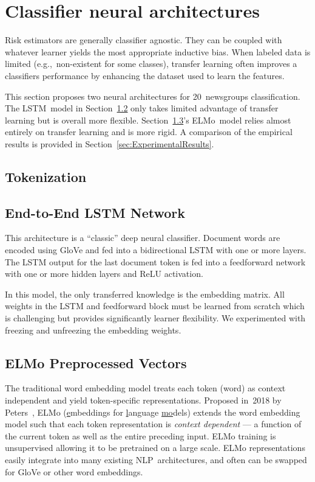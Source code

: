 \section{Classifier neural architectures}\label{sec:Architectures}

Risk estimators are generally classifier agnostic.  They can be coupled with whatever learner yields the most appropriate inductive bias. When labeled data is limited (e.g.,~non-existent for some classes), transfer learning often improves a classifiers performance by enhancing the dataset used to learn the features.

This section proposes two neural architectures for 20~newsgroups classification.  The LSTM~model in Section~\ref{sec:Architectures:LSTM} only takes limited advantage of transfer learning but is overall more flexible.  Section~\ref{sec:Architectures:ELMo}'s ELMo~model relies almost entirely on transfer learning and is more rigid. A comparison of the empirical results is provided in Section~\ref{sec:ExperimentalResults}.

\subsection{Tokenization}



\subsection{End-to-End LSTM Network}\label{sec:Architectures:LSTM}

This architecture is a ``classic'' deep neural classifier.  Document words are encoded using GloVe and fed into a bidirectional LSTM with one or more layers.  The LSTM output for the last document token is fed into a feedforward network with one or more hidden layers and ReLU activation.

In this model, the only transferred knowledge is the embedding matrix. All weights in the LSTM and feedforward block must be learned from scratch which is challenging but provides significantly learner flexibility.  We experimented with freezing and unfreezing the embedding weights.

\subsection{ELMo Preprocessed Vectors}\label{sec:Architectures:ELMo}

The traditional word embedding model treats each token (word) as context independent and yield token-specific representations. Proposed in~2018 by Peters\etal~\cite{Peters:2018}, ELMo (\underline{e}mbeddings for \underline{l}anguage \underline{mo}dels) extends the word embedding model such that each token representation is \textit{context dependent} --- a function of the current token as well as the entire preceding input.  ELMo training is unsupervised allowing it to be pretrained on a large scale.  ELMo representations easily integrate into many existing NLP~architectures, and often can be swapped for GloVe or other word embeddings.

